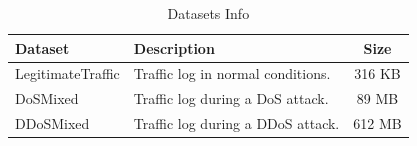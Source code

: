 \begin{table}[!htbp]
\centering
\begin{tabular}{|l|l|c|}
\hline
\textbf{Dataset} & \textbf{Description}                              & \textbf{Size} \\ \hline
LegitimateTraffic         & Traffic log in normal conditions. & 316 KB        \\ 
DoSMixed        & Traffic log during a DoS attack.                   & 89 MB       \\ 
DDoSMixed        & Traffic log during a DDoS attack. & 612 MB        \\ \hline
\end{tabular}
\caption{Datasets Info}
\label{tab:dataset_info}
\end{table}
